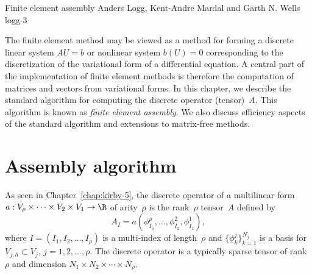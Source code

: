               {Finite element assembly}
              {Anders Logg, Kent-Andre Mardal and Garth N. Wells}
              {logg-3}

The finite element method may be viewed as a method for forming a discrete
linear system $AU = b$ or nonlinear system $b(U) = 0$ corresponding to
the discretization of the variational form of a differential equation. A
central part of the implementation of finite element methods is therefore
the computation of matrices and vectors from variational forms. In this
chapter, we describe the standard algorithm for computing the discrete
operator (tensor)~$A$. This algorithm is known as \emph{finite element
assembly}. We also discuss efficiency aspects of the standard algorithm
and extensions to matrix-free methods.

\section{Assembly algorithm}

As seen in Chapter~\ref{chap:kirby-5}, the discrete operator of a
multilinear form~$a : V_{\rho} \times \cdots \times V_2 \times V_1
\rightarrow \R$ of arity~$\rho$ is the rank~$\rho$ tensor~$A$ defined
by
\begin{equation}
  A_I = a(\phi^{\rho}_{I_{\rho}}, \ldots, \phi^2_{I_2}, \phi^1_{I_1}),
\end{equation}
where $I = (I_1, I_2, \ldots, I_{\rho})$ is a multi-index of
length~$\rho$ and $\{\phi^j_k\}_{k=1}^{N_j}$ is a basis for $V_{j,h}
\subset V_j$, $j = 1,2,\ldots,\rho$. The discrete operator is a
typically sparse tensor of rank~$\rho$ and dimension $N_1 \times N_2
\times \cdots \times N_{\rho}$.

